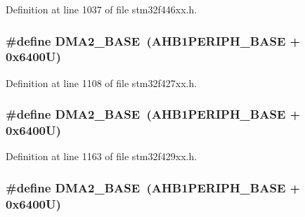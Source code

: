 Definition at line 1037 of file stm32f446xx.\+h.

\subsubsection[{\texorpdfstring{D\+M\+A2\+\_\+\+B\+A\+SE}{DMA2_BASE}}]{\setlength{\rightskip}{0pt plus 5cm}\#define D\+M\+A2\+\_\+\+B\+A\+SE~({\bf A\+H\+B1\+P\+E\+R\+I\+P\+H\+\_\+\+B\+A\+SE} + 0x6400\+U)}\hypertarget{group___peripheral__memory__map_gab72a9ae145053ee13d1d491fb5c1df64}{}\label{group___peripheral__memory__map_gab72a9ae145053ee13d1d491fb5c1df64}


Definition at line 1108 of file stm32f427xx.\+h.

\subsubsection[{\texorpdfstring{D\+M\+A2\+\_\+\+B\+A\+SE}{DMA2_BASE}}]{\setlength{\rightskip}{0pt plus 5cm}\#define D\+M\+A2\+\_\+\+B\+A\+SE~({\bf A\+H\+B1\+P\+E\+R\+I\+P\+H\+\_\+\+B\+A\+SE} + 0x6400\+U)}\hypertarget{group___peripheral__memory__map_gab72a9ae145053ee13d1d491fb5c1df64}{}\label{group___peripheral__memory__map_gab72a9ae145053ee13d1d491fb5c1df64}


Definition at line 1163 of file stm32f429xx.\+h.

\subsubsection[{\texorpdfstring{D\+M\+A2\+\_\+\+B\+A\+SE}{DMA2_BASE}}]{\setlength{\rightskip}{0pt plus 5cm}\#define D\+M\+A2\+\_\+\+B\+A\+SE~({\bf A\+H\+B1\+P\+E\+R\+I\+P\+H\+\_\+\+B\+A\+SE} + 0x6400\+U)}\hypertarget{group___peripheral__memory__map_gab72a9ae145053ee13d1d491fb5c1df64}{}\label{group___peripheral__memory__map_gab72a9ae145053ee13d1d491fb5c1df64}


